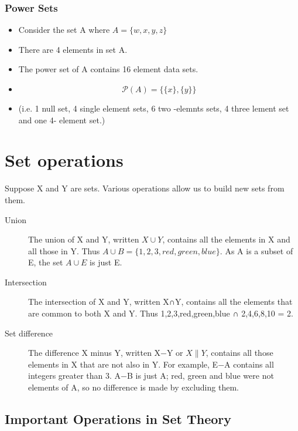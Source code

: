 \subsubsection*{Power Sets}
\begin{itemize}
\item Consider the set A where $ A = \{w,x,y,z\}$
\item There are 4 elements in set A.
\item The power set of A contains 16 element data sets.
\item \[  \mathcal{P}(A) = \{\{ x \}, \{ y \} \}  \]
\item (i.e. 1 null set, 4 single element sets, 6 two -elemnts sets, 4 three lement set and one 4- element set.)
\end{itemize}





\section{Set operations}

Suppose X and Y are sets. Various operations allow us to build new sets from them.

\begin{description}
\item[Union]
The union of X and Y, written $X\cup Y$, contains all the elements in X and all those in Y. Thus $A \cup B = \{1, 2, 3, red, green, blue\}$. As A is a subset of E, the set $A \cup E$ is just E.

\item[Intersection]

The intersection of X and Y, written X∩Y, contains all the elements that are common to both X and Y. Thus {1,2,3,red,green,blue} ∩ {2,4,6,8,10} = {2}.

\item[Set difference]

The difference X minus Y, written X−Y or $X\|Y$, contains all those elements in X that are not also in Y. For example, E−A contains all integers greater than 3. A−B is just A; red, green and blue were not elements of A, so no difference is made by excluding them.
\end{description}



\subsection{Important Operations in Set Theory}

